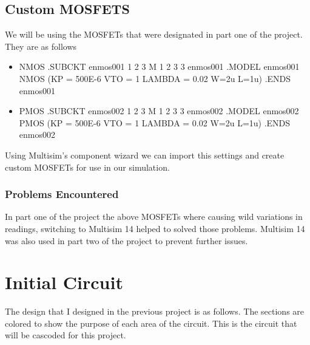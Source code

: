 \documentclass[12pt]{article}
\begin{document}
\subsection{Custom MOSFETS}
\label{sec:desigan_and_analysis}

We will be using the MOSFETs that were designated in part one of the project. They are as follows

\begin{itemize}
	\item NMOS \newline \newline
	.SUBCKT enmos001 1 2 3 \newline
	M 1 2 3 3 enmos001\newline
	.MODEL enmos001 NMOS (KP = 500E-6 VTO = 1 LAMBDA = 0.02 W=2u L=1u)\newline
	.ENDS enmos001
\newline
	\item PMOS \newline \newline
	.SUBCKT enmos002 1 2 3 \newline
	M 1 2 3 3 enmos002\newline
	.MODEL enmos002 PMOS (KP = 500E-6 VTO = 1 LAMBDA = 0.02 W=2u L=1u)\newline
	.ENDS enmos002
\newline
	
\end{itemize}

Using Multisim's component wizard we can import this settings and create custom MOSFETs for use in our simulation.

\subsubsection{Problems Encountered}
In part one of the project the above MOSFETs where causing wild variations in readings, switching to Multisim 14 helped to solved those problems. Multisim 14 was also used in part two of the project to prevent further issues.


\section{Initial Circuit}
The design that I designed in the previous project is as follows. The sections are colored to show the purpose of each area of the circuit. This is the circuit that will be cascoded for this project.
\end{document}
